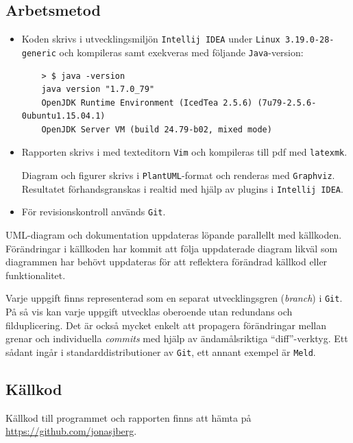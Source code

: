 \subsection*{Arbetsmetod}
\begin{itemize}
    \item Koden skrivs i utvecklingsmiljön \texttt{Intellij IDEA} under
    \texttt{Linux 3.19.0-28-generic} och kompileras samt exekveras med följande
    \texttt{Java}-version:
    \begin{verbatim}
    > $ java -version
    java version "1.7.0_79"
    OpenJDK Runtime Environment (IcedTea 2.5.6) (7u79-2.5.6-0ubuntu1.15.04.1)
    OpenJDK Server VM (build 24.79-b02, mixed mode)
    \end{verbatim}

    \item Rapporten skrivs i \latex med texteditorn \texttt{Vim} och kompileras
    till pdf med \texttt{latexmk}.
    \par Diagram och figurer skrivs i \texttt{PlantUML}-format och renderas med
    \texttt{Graphviz}. Resultatet förhandsgranskas i realtid med hjälp av
    plugins i \texttt{Intellij IDEA}.

    \item För revisionskontroll används \texttt{Git}.
\end{itemize}

UML-diagram och dokumentation uppdateras löpande parallellt med källkoden.
Förändringar i källkoden har kommit att följa uppdaterade diagram likväl som
diagrammen har behövt uppdateras för att reflektera förändrad källkod eller
funktionalitet.
\par Varje uppgift finns representerad som en separat utvecklingsgren
(\emph{branch}) i \texttt{Git}. På så vis kan varje uppgift utvecklas oberoende
utan redundans och filduplicering. Det är också mycket enkelt att propagera
förändringar mellan grenar och individuella \emph{commits} med hjälp av
ändamålsriktiga ``diff''-verktyg. Ett sådant ingår i standarddistributioner av
\texttt{Git}, ett annant exempel är \texttt{Meld}.


\subsection*{Källkod}
\par Källkod till programmet och rapporten finns att hämta på \url{https://github.com/jonasjberg}.
